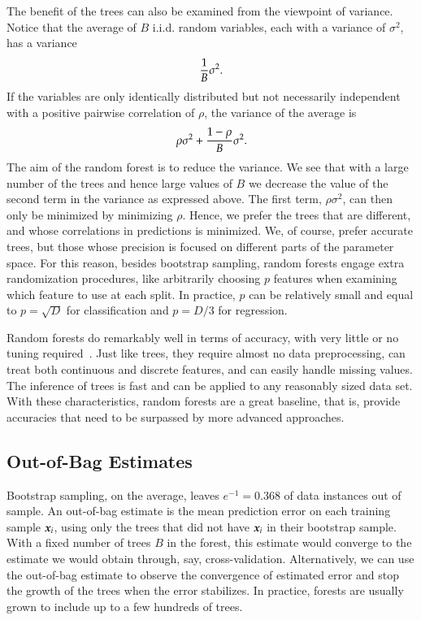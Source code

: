 \begin{refsection}
The benefit of the trees can also be examined from the viewpoint of variance. Notice that the average of $B$ i.i.d. random variables, each with a variance of $\sigma^2$, has a variance 
$${1\over B}\sigma^2.$$
If the variables are only identically distributed but not necessarily independent with a positive pairwise correlation of $\rho$, the variance of the average is 
$$\rho\sigma^2+{1-\rho\over B}\sigma^2.$$
The aim of the random forest is to reduce the variance. We see that with a large number of the trees and hence large values of $B$ we decrease the value of the second term in the variance as expressed above. The first term, $\rho\sigma^2$, can then only be minimized by minimizing $\rho$. Hence, we prefer the trees that are different, and whose correlations in predictions is minimized. We, of course, prefer accurate trees, but those whose precision is focused on different parts of the parameter space. For this reason, besides bootstrap sampling, random forests engage extra randomization procedures, like arbitrarily choosing $p$ features when examining which feature to use at each split. In practice, $p$ can be relatively small and equal to $p=\sqrt{D}$ for classification and $p=D/3$ for regression.

Random forests do remarkably well in terms of accuracy, with very little or no tuning required~\cite{Fernandez-Delgado2014}. Just like trees, they require almost no data preprocessing, can treat both continuous and discrete features, and can easily handle missing values. The inference of trees is fast and can be applied to any reasonably sized data set. With these characteristics, random forests are a great baseline, that is, provide accuracies that need to be surpassed by more advanced approaches.

\subsection*{Out-of-Bag Estimates}

Bootstrap sampling, on the average, leaves $e^{-1}=0.368$ of data instances out of sample. An out-of-bag estimate is the mean prediction error on each training sample $\boldsymbol{x}_i$, using only the trees that did not have $\boldsymbol{x}_i$ in their bootstrap sample. With a fixed number of trees $B$ in the forest, this estimate would converge to the estimate we would obtain through, say, cross-validation. Alternatively, we can use the out-of-bag estimate to observe the convergence of estimated error and stop the growth of the trees when the error stabilizes. In practice, forests are usually grown to include up to a few hundreds of trees.


\end{refsection}
